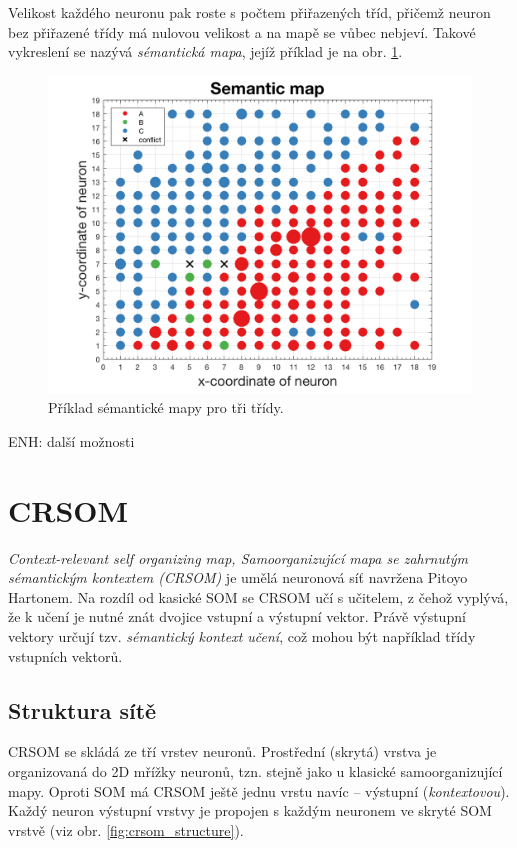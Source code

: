 \documentclass[thesis=M,czech]{FITthesis}[2012/06/26]
\begin{document}
Velikost každého neuronu pak roste s počtem přiřazených tříd, přičemž neuron bez přiřazené třídy má nulovou velikost a na mapě se vůbec nebjeví. Takové vykreslení se nazývá \textit{sémantická mapa}, jejíž příklad je na obr. \ref{fig:semanticmap}.


\begin{figure}[htbp]
\begin{center}
	\includegraphics[scale=0.3]{exp_sem_map.png}
\caption{Příklad sémantické mapy pro tři třídy.}
\label{fig:semanticmap}
\end{center}
\end{figure}


ENH: další možnosti



\section{CRSOM}\label{sec:crsom_teo}
\textit{Context-relevant self organizing map, Samoorganizující mapa se zahrnutým sémantickým kontextem (CRSOM)} je umělá neuronová síť navržena Pitoyo Hartonem. Na rozdíl od kasické SOM se CRSOM učí s učitelem, z čehož vyplývá, že k učení je nutné znát dvojice vstupní a výstupní vektor. Právě výstupní vektory určují tzv. \textit{sémantický kontext učení}, což mohou být například třídy vstupních vektorů.

\subsection{Struktura sítě}
CRSOM se skládá ze tří vrstev neuronů. Prostřední (skrytá) vrstva je organizovaná do 2D mřížky neuronů, tzn. stejně jako u klasické samoorganizující mapy.
 Oproti SOM má CRSOM ještě jednu vrstu navíc -- výstupní (\textit{kontextovou}).  Každý neuron výstupní vrstvy je propojen s každým neuronem ve skryté SOM vrstvě (viz obr. \ref{fig:crsom_structure}). 
 
\end{document}
